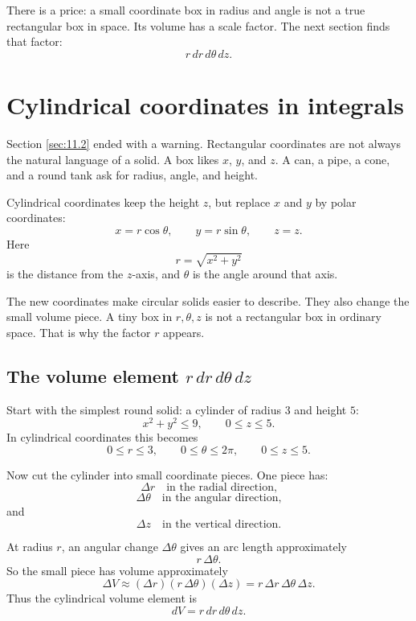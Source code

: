There is a price: a small coordinate box in radius and angle is not a true rectangular
box in space.  Its volume has a scale factor.  The next section finds that factor:
\[
    r\,dr\,d\theta\,dz.
\]
\section{Cylindrical coordinates in integrals}
\label{sec:11.3}

Section \ref{sec:11.2} ended with a warning.  Rectangular coordinates are not always
the natural language of a solid.  A box likes \(x\), \(y\), and \(z\).  A can, a pipe, a
cone, and a round tank ask for radius, angle, and height.

Cylindrical coordinates keep the height \(z\), but replace \(x\) and \(y\) by polar
coordinates:
\[
    x=r\cos\theta,\qquad y=r\sin\theta,\qquad z=z.
\]
Here
\[
    r=\sqrt{x^2+y^2}
\]
is the distance from the \(z\)-axis, and \(\theta\) is the angle around that axis.

The new coordinates make circular solids easier to describe.  They also change the
small volume piece.  A tiny box in \(r,\theta,z\) is not a rectangular box in ordinary
space.  That is why the factor \(r\) appears.

\subsection{The volume element \texorpdfstring{\(r\,dr\,d\theta\,dz\)}{r dr dtheta dz}}

Start with the simplest round solid: a cylinder of radius \(3\) and height \(5\):
\[
    x^2+y^2\le 9,\qquad 0\le z\le5.
\]
In cylindrical coordinates this becomes
\[
    0\le r\le3,\qquad 0\le\theta\le2\pi,\qquad 0\le z\le5.
\]

Now cut the cylinder into small coordinate pieces.  One piece has:
\[
    \Delta r \quad\text{in the radial direction,}
\]
\[
    \Delta\theta \quad\text{in the angular direction,}
\]
and
\[
    \Delta z \quad\text{in the vertical direction.}
\]

At radius \(r\), an angular change \(\Delta\theta\) gives an arc length approximately
\[
    r\,\Delta\theta.
\]
So the small piece has volume approximately
\[
    \Delta V
    \approx
    (\Delta r)(r\,\Delta\theta)(\Delta z)
    =
    r\,\Delta r\,\Delta\theta\,\Delta z.
\]
Thus the cylindrical volume element is
\[
\boxed{
    dV=r\,dr\,d\theta\,dz.
}
\]

